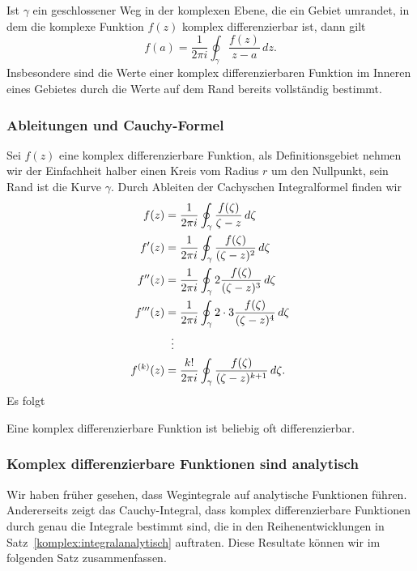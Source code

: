 \begin{satz}[Cauchy]
Ist $\gamma$ ein geschlossener Weg in der komplexen Ebene, die ein
Gebiet umrandet, in dem die komplexe Funktion $f(z)$ komplex
differenzierbar ist, dann gilt
\[
f(a)=\frac{1}{2\pi i}\oint_{\gamma}\frac{f(z)}{z-a}\,dz.
\]
Insbesondere sind die Werte einer komplex differenzierbaren Funktion
im Inneren eines Gebietes durch die Werte auf dem Rand bereits vollständig
bestimmt.
\end{satz}

%
%
\subsubsection{Ableitungen und Cauchy-Formel}
Sei $f(z)$ eine komplex differenzierbare Funktion, als Definitionsgebiet
nehmen wir der Einfachheit halber einen Kreis vom Radius $r$ um den Nullpunkt,
sein Rand ist die Kurve $\gamma$.
Durch Ableiten der Cachyschen Integralformel finden wir
\begin{align*}
f(z)
&=
\frac1{2\pi i}\oint_{\gamma}\frac{f(\zeta)}{\zeta-z}\,d\zeta
\\
f'(z)
&=
\frac1{2\pi i}\oint_{\gamma}\frac{f(\zeta)}{(\zeta-z)^2}\,d\zeta
\\
f'' (z)
&=
\frac1{2\pi i}\oint_{\gamma}2\frac{f(\zeta)}{(\zeta-z)^3}\,d\zeta
\\
f'''(z)
&=
\frac1{2\pi i}\oint_{\gamma}2\cdot 3\frac{f(\zeta)}{(\zeta-z)^4}\,d\zeta
\\
&\hspace*{2mm}\vdots
\\
f^{(k)}(z)
&=
\frac{k!}{2\pi i}\oint_{\gamma}\frac{f(\zeta)}{(\zeta-z)^{k+1}}\,d\zeta.
\end{align*}
Es folgt

\begin{satz}
Eine komplex differenzierbare Funktion ist beliebig oft differenzierbar.
\end{satz}

%
%
\subsubsection{Komplex differenzierbare Funktionen sind analytisch}
Wir haben früher gesehen, dass Wegintegrale auf analytische Funktionen
führen.
Andererseits zeigt das Cauchy-Integral, dass komplex differenzierbare
Funktionen durch genau die Integrale bestimmt sind, die in den
Reihenentwicklungen in Satz~\ref{komplex:integralanalytisch} auftraten.
Diese Resultate können wir im folgenden Satz zusammenfassen.

